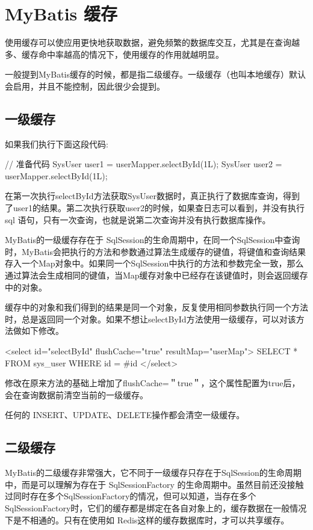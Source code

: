 \section{MyBatis 缓存}

使用缓存可以使应用更快地获取数据，避免频繁的数据库交互，尤其是在查询越多、缓存命中率越高的情况下，使用缓存的作用就越明显。

一般提到MyBatis缓存的时候，都是指二级缓存。一级缓存（也叫本地缓存）默认会启用，并且不能控制，因此很少会提到。

\subsection{一级缓存}

如果我们执行下面这段代码:

\begin{Java}
// 准备代码
SysUser user1 = userMapper.selectById(1L);
SysUser user2 = userMapper.selectById(1L);
\end{Java}

在第一次执行selectById方法获取SysUser数据时，真正执行了数据库查询，得到了user1的结果。第二次执行获取user2的时候，如果查日志可以看到，并没有执行 sql 语句，只有一次查询，也就是说第二次查询并没有执行数据库操作。

MyBatis的一级缓存存在于 SqlSession的生命周期中，在同一个SqlSession中查询时，MyBatis会把执行的方法和参数通过算法生成缓存的键值，将键值和查询结果存入一个Map对象中。如果同一个SqlSession中执行的方法和参数完全一致，那么通过算法会生成相同的键值，当Map缓存对象中已经存在该键值时，则会返回缓存中的对象。

缓存中的对象和我们得到的结果是同一个对象，反复使用相同参数执行同一个方法时，总是返回同一个对象。如果不想让selectById方法使用一级缓存，可以对该方法做如下修改。

\begin{xml}
<select id="selectById" flushCache="true" resultMap="userMap">
    SELECT * FROM sys_user WHERE id = #{id}
</select>
\end{xml}

修改在原来方法的基础上增加了flushCache=＂true＂，这个属性配置为true后，会在查询数据前清空当前的一级缓存。

任何的 INSERT、UPDATE、DELETE操作都会清空一级缓存。

\subsection{二级缓存}

MyBatis的二级缓存非常强大，它不同于一级缓存只存在于SqlSession的生命周期中，而是可以理解为存在于 SqlSessionFactory 的生命周期中。虽然目前还没接触过同时存在多个SqlSessionFactory的情况，但可以知道，当存在多个SqlSessionFactory时，它们的缓存都是绑定在各自对象上的，缓存数据在一般情况下是不相通的。只有在使用如 Redis这样的缓存数据库时，才可以共享缓存。

